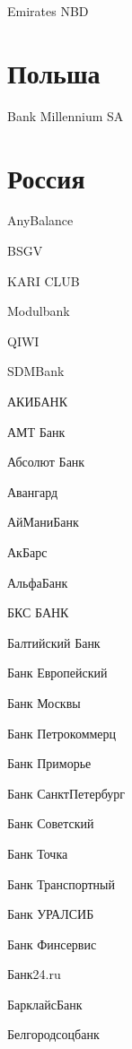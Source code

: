 \documentclass[a4paper,10pt,russian]{sphinxmanual}
\begin{document}
\sphinxAtStartPar
Emirates NBD


\section{Польша}
\label{\detokenize{banks:id10}}
\sphinxAtStartPar
Bank Millennium SA


\section{Россия}
\label{\detokenize{banks:id11}}
\sphinxAtStartPar
AnyBalance

\sphinxAtStartPar
BSGV

\sphinxAtStartPar
KARI CLUB

\sphinxAtStartPar
Modulbank

\sphinxAtStartPar
QIWI

\sphinxAtStartPar
SDM\sphinxhyphen{}Bank

\sphinxAtStartPar
АКИБАНК

\sphinxAtStartPar
АМТ Банк

\sphinxAtStartPar
Абсолют Банк

\sphinxAtStartPar
Авангард

\sphinxAtStartPar
АйМаниБанк

\sphinxAtStartPar
АкБарс

\sphinxAtStartPar
Альфа\sphinxhyphen{}Банк

\sphinxAtStartPar
БКС БАНК

\sphinxAtStartPar
Балтийский Банк

\sphinxAtStartPar
Банк Европейский

\sphinxAtStartPar
Банк Москвы

\sphinxAtStartPar
Банк Петрокоммерц

\sphinxAtStartPar
Банк Приморье

\sphinxAtStartPar
Банк Санкт\sphinxhyphen{}Петербург

\sphinxAtStartPar
Банк Советский

\sphinxAtStartPar
Банк Точка

\sphinxAtStartPar
Банк Транспортный

\sphinxAtStartPar
Банк УРАЛСИБ

\sphinxAtStartPar
Банк Финсервис

\sphinxAtStartPar
Банк24.ru

\sphinxAtStartPar
Барклайс\sphinxhyphen{}Банк

\sphinxAtStartPar
Белгородсоцбанк
\end{document}
